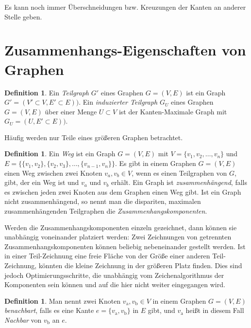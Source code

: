 \documentclass[a4paper]{scrreprt}
\theoremstyle{definition}
\newtheorem{definition}[satz]{Definition}
\begin{document}
Es kann noch immer Überschneidungen bzw. Kreuzungen der Kanten an anderer Stelle geben.

\section{Zusammenhangs-Eigenschaften von Graphen}

\begin{definition}
  Ein \emph{Teilgraph} $G'$ eines Graphen $G=(V, E)$ ist ein Graph $G' = (V' \subset V, E' \subset E))$.
  Ein \emph{induzierter Teilgraph} $G_U$ eines Graphen $G=(V, E)$ über einer Menge $U \subset V$ ist der Kanten-Maximale Graph mit $G_U = (U , E' \subset E))$.
\end{definition}

Häufig werden nur Teile eines größeren Graphen betrachtet. %

\begin{definition}
  Ein \emph{Weg} ist ein Graph $G = (V, E)$ mit $V = \{v_1, v_2, \dots, v_n\}$ und $E = \{\{v_1, v_2\}, \{v_2, v_3\}, \dots, \{v_{n-1}, v_{n}\}\}$.
  Es gibt in einem Graphen $G = (V, E)$ einen Weg zwischen zwei Knoten $v_a, v_b \in V$, wenn es einen Teilgraphen von $G$, gibt, der ein Weg ist und $v_a$ und $v_b$ erhält.
  Ein Graph ist \emph{zusammenhängend}, falls es zwischen jeden zwei Knoten aus dem Graphen einen Weg gibt.
  Ist ein Graph nicht zusammenhängend, so nennt man die dispariten, maximalen zusammenhängenden Teilgraphen die \emph{Zusammenhangskomponenten}.
\end{definition}

Werden die Zusammenhangskomponenten einzeln gezeichnet, dann können sie unabhängig voneinander platziert werden: Zwei Zeichnungen von getrennten Zusammenhangskomponenten können beliebig nebeneinander gestellt werden. Ist in einer Teil-Zeichnung eine freie Fläche von der Größe einer anderen Teil-Zeichnung, könnten die kleine Zeichnung in der größeren Platz finden. Dies sind jedoch Optimierungsschritte, die unabhängig vom Zeichenalgorithmus der Komponenten sein können und auf die hier nicht weiter eingegangen wird.

\begin{definition}
  Man nennt zwei Knoten $v_\text{a}, v_\text{b} \in V$ in einem Graphen $G = (V, E)$ \emph{benachbart}, falls es eine Kante $e = \{v_\text{a}, v_\text{b}\}$ in $E$ gibt, und $v_\text{a}$ heißt in diesem Fall \emph{Nachbar} von $ v_\text{b}$ an $e$. 
\end{definition}
\end{document}

